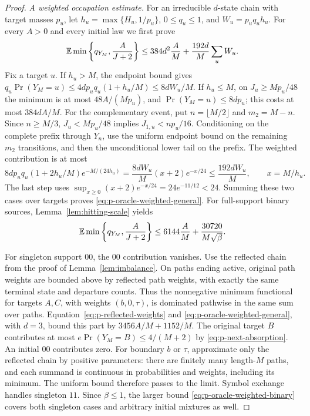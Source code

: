 \begin{proof}
\emph{A weighted occupation estimate.}
For an irreducible $d$-state chain with target masses $p_u$, let
$h_u=\max\{H_u,1/p_u\}$, $0\le q_u\le1$, and $W_u=p_uq_uh_u$.
For every $A>0$ and every initial law we first prove
\begin{equation}\label{eq:p-oracle-weighted-general}
 \mathbb E\min\left\{q_{Y_M},\frac A{J+2}\right\}
 \le384d^2\frac AM+\frac{192d}{M}\sum_uW_u.
\end{equation}
Fix a target $u$.  If $h_u>M$, the endpoint bound gives
$q_u\Pr(Y_M=u)\le4dp_uq_u(1+h_u/M)\le8dW_u/M$.
If $h_u\le M$, on $J_u\ge Mp_u/48$ the minimum is at most
$48A/(Mp_u)$, and $\Pr(Y_M=u)\le8dp_u$; this costs at most
$384dA/M$.  For the complementary event, put $n=\lfloor M/2\rfloor$
and $m_2=M-n$.  Since $n\ge M/3$,
$J_u<Mp_u/48$ implies $J_{1,u}<np_u/16$.
Conditioning on the complete prefix through $Y_n$, use the uniform
endpoint bound on the remaining $m_2$ transitions, and then the
unconditional lower tail on the prefix.  The weighted contribution is
at most
\[
 8dp_uq_u(1+2h_u/M)e^{-M/(24h_u)}
 =\frac{8dW_u}{M}(x+2)e^{-x/24}
 \le\frac{192dW_u}{M},\qquad x=M/h_u.
\]
The last step uses
$\sup_{x\ge0}(x+2)e^{-x/24}=24e^{-11/12}<24$.
Summing these two cases over targets proves
\eqref{eq:p-oracle-weighted-general}.
For full-support binary sources, Lemma~\ref{lem:hitting-scale} yields
\begin{equation}\label{eq:p-oracle-weighted-binary}
 \mathbb E\min\left\{q_{Y_M},\frac A{J+2}\right\}
 \le6144\frac AM+\frac{30720}{M\sqrt\beta}.
\end{equation}

For singleton support $00$, the $00$ contribution vanishes.  Use the
reflected chain from the proof of Lemma~\ref{lem:imbalance}.  On paths
ending active, original path weights are bounded above by reflected
path weights, with exactly the same terminal state and departure counts.
Thus the nonnegative minimum functional for targets $A,C$, with weights
$(b,0,\tau)$, is dominated pathwise in the same sum over paths.
Equation~\eqref{eq:p-reflected-weights} and
\eqref{eq:p-oracle-weighted-general}, with $d=3$, bound this part by
$3456A/M+1152/M$.  The original target $B$ contributes at most
$e\Pr(Y_M=B)\le4/(M+2)$ by \eqref{eq:p-next-absorption}.
An initial $00$ contributes zero.  For boundary $b$ or $\tau$, approximate
only the reflected chain by positive parameters: there are finitely many
length-$M$ paths, and each summand is continuous in probabilities and
weights, including its minimum.  The uniform bound therefore passes to
the limit.  Symbol exchange handles singleton $11$.
Since $\beta\le1$, the larger bound
\eqref{eq:p-oracle-weighted-binary} covers both singleton cases and
arbitrary initial mixtures as well.


\end{proof}
